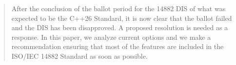 \begin{abstract}
After the conclusion of the ballot period for the 14882 DIS of what was expected
to be the C++26 Standard, it is now clear that the ballot failed and the DIS has
been disapproved. A proposed resolution is needed as a response. In this paper,
we analyze current options and we make a recommendation ensuring that most
of the features are included in the ISO/IEC 14882 Standard as soon as possible.
\end{abstract}

